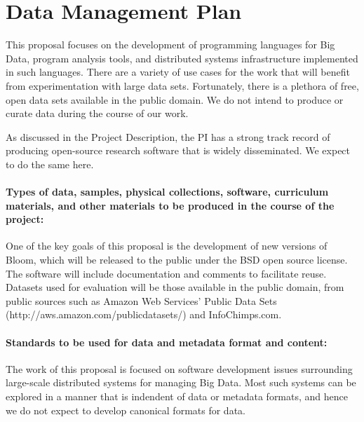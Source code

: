 \newpage




\newpage



\section*{Data Management Plan}


This proposal focuses on the development of programming languages for Big Data, program analysis tools, and distributed systems infrastructure implemented in such languages.  There are a variety of use cases for the work that will benefit from experimentation with large data sets.  Fortunately, there is a plethora of free, open data sets available in the public domain.  We do not intend to produce or curate data during the course of our work.

As discussed in the Project Description, the PI has a strong track record of producing open-source research software that is widely disseminated.  We expect to do the same here.


\paragraph{Types of data, samples, physical collections, software,
  curriculum materials, and other materials to be produced in the
  course of the project:}  One of the key goals of this proposal is the development of new versions of Bloom, which will be released to the public under the BSD open source license. The software will include documentation and comments to facilitate reuse. Datasets used for evaluation will be those available in the public domain, from public sources such as Amazon Web Services' Public Data Sets (http://aws.amazon.com/publicdatasets/) and InfoChimps.com.

\paragraph{Standards to be used for data and metadata format and
  content:}  The work of this proposal is focused on software development issues surrounding large-scale distributed systems for managing Big Data.  Most such systems can be explored in a manner that is indendent of data or metadata formats, and hence we do not expect to develop canonical formats for data.  

